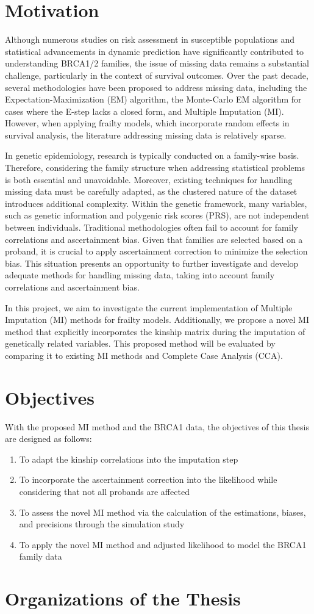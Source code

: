 \section{Motivation}
Although numerous studies on risk assessment in susceptible populations and statistical advancements in dynamic prediction have significantly contributed to understanding BRCA1/2 families, the issue of missing data remains a substantial challenge, particularly in the context of survival outcomes.
Over the past decade, several methodologies have been proposed to address missing data, including the Expectation-Maximization (EM) algorithm, the Monte-Carlo EM algorithm for cases where the E-step lacks a closed form, and Multiple Imputation (MI). 
However, when applying frailty models, which incorporate random effects in survival analysis, the literature addressing missing data is relatively sparse.

In genetic epidemiology, research is typically conducted on a family-wise basis.
Therefore, considering the family structure when addressing statistical problems is both essential and unavoidable. 
Moreover, existing techniques for handling missing data must be carefully adapted, as the clustered nature of the dataset introduces additional complexity.
Within the genetic framework, many variables, such as genetic information and polygenic risk scores (PRS), are not independent between individuals. 
Traditional methodologies often fail to account for family correlations and ascertainment bias. 
Given that families are selected based on a proband, it is crucial to apply ascertainment correction to minimize the selection bias.
This situation presents an opportunity to further investigate and develop adequate methods for handling missing data, taking into account family correlations and ascertainment bias.

In this project, we aim to investigate the current implementation of Multiple Imputation (MI) methods for frailty models. 
Additionally, we propose a novel MI method that explicitly incorporates the kinship matrix during the imputation of genetically related variables. 
This proposed method will be evaluated by comparing it to existing MI methods and Complete Case Analysis (CCA).

\section{Objectives}
With the proposed MI method and the BRCA1 data, the objectives of this thesis are designed as follows: 
\begin{enumerate}
    \item To adapt the kinship correlations into the imputation step
    \item To incorporate the ascertainment correction into the likelihood while considering that not all probands are affected
    \item To assess the novel MI method via the calculation of the estimations, biases, and precisions through the simulation study
    \item To apply the novel MI method and adjusted likelihood to model the BRCA1 family data
\end{enumerate}

\section{Organizations of the Thesis}
